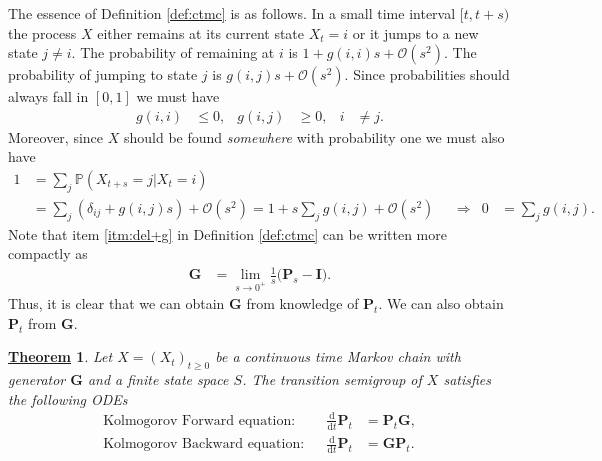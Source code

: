 \documentclass[12pt]{book}
\numberwithin{equation}{chapter}
\theoremstyle{plain}
\newtheorem{theorem}{\underline{Theorem}}
\numberwithin{theorem}{section}
\theoremstyle{definition}
\numberwithin{exercise}{chapter}
\newcommand{\<}{\langle}
\renewcommand{\>}{\rangle}
\renewcommand{\(}{\left(}
\renewcommand{\)}{\right)}
\renewcommand{\[}{\left[}
\renewcommand{\]}{\right]}
\newcommand\Pb{\mathds{P}}
\newcommand\Oc{\mathscr{O}}
\newcommand\del{\delta}
\newcommand\Gv{\pmb{G}}
\newcommand\Iv{\pmb{I}}
\newcommand\Pv{\pmb{P}}
\newcommand\dd{\mathrm{d}}
\begin{document}
\noindent
The essence of Definition \ref{def:ctmc} is as follows.  In a small time interval $[t,t+s)$ the process $X$ either remains at its current state $X_t=i$ or it jumps to a new state $j \neq i$.  The probability of remaining at $i$ is $1+g(i,i)s + \Oc(s^2)$.  The probability of jumping to state $j$ is $g(i,j)s + \Oc(s^2)$.  Since probabilities should always fall in $[0,1]$ we must have
\begin{align}
g(i,i)
	&\leq 0 , &
g(i,j)
	&\geq 0 , &
i
	&\neq j .
\end{align}
Moreover, since $X$ should be found \emph{somewhere} with probability one we must also have
\begin{align}
1
	&=	\sum_j \Pb( X_{t+s} = j | X_t = i ) \\
	&=	\sum_j ( \del_{ij} + g(i,j) s ) + \Oc(s^2)
	=		1 + s \sum_j g(i,j) + \Oc(s^2) &
	&		\Rightarrow &
0
	&=	\sum_j g(i,j) .
\end{align}
Note that item \ref{itm:del+g} in Definition \ref{def:ctmc} can be written more compactly as
\begin{align}
\Gv
	&= \lim_{s \to 0^+} \frac{1}{s} \Big( \Pv_s - \Iv \Big) .
\end{align}
Thus, it is clear that we can obtain $\Gv$ from knowledge of $\Pv_t$.  We can also obtain $\Pv_t$ from $\Gv$.

\begin{theorem}
\label{thm:kfe.kbe}
Let $X = (X_t)_{t \geq 0}$ be a continuous time Markov chain with generator $\Gv$ and a finite state space $S$.  The transition semigroup of $X$ satisfies the following ODEs
\begin{align}
\text{Kolmogorov Forward equation}:&&
\frac{\dd}{\dd t} \Pv_t
	&=	\Pv_t \Gv , \label{eq:kfe} \\
\text{Kolmogorov Backward equation}:&&
\frac{\dd}{\dd t} \Pv_t
	&=	\Gv \Pv_t . \label{eq:kbe}
\end{align}
\end{theorem}
\end{document}
